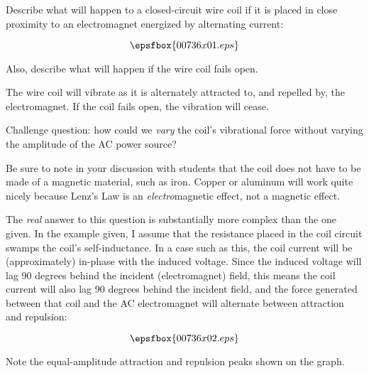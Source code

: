 

Describe what will happen to a closed-circuit wire coil if it is placed in close proximity to an electromagnet energized by alternating current:

$$\epsfbox{00736x01.eps}$$

Also, describe what will happen if the wire coil fails open.







The wire coil will vibrate as it is alternately attracted to, and repelled by, the electromagnet.  If the coil fails open, the vibration will cease.

\vskip 10pt

Challenge question: how could we {\it vary} the coil's vibrational force without varying the amplitude of the AC power source?







Be sure to note in your discussion with students that the coil does not have to be made of a magnetic material, such as iron.  Copper or aluminum will work quite nicely because Lenz's Law is an {\it electro}magnetic effect, not a magnetic effect.

\vskip 10pt

The {\it real} answer to this question is substantially more complex than the one given.  In the example given, I assume that the resistance placed in the coil circuit swamps the coil's self-inductance.  In a case such as this, the coil current will be (approximately) in-phase with the induced voltage.  Since the induced voltage will lag 90 degrees behind the incident (electromagnet) field, this means the coil current will also lag 90 degrees behind the incident field, and the force generated between that coil and the AC electromagnet will alternate between attraction and repulsion:

$$\epsfbox{00736x02.eps}$$

Note the equal-amplitude attraction and repulsion peaks shown on the graph.

